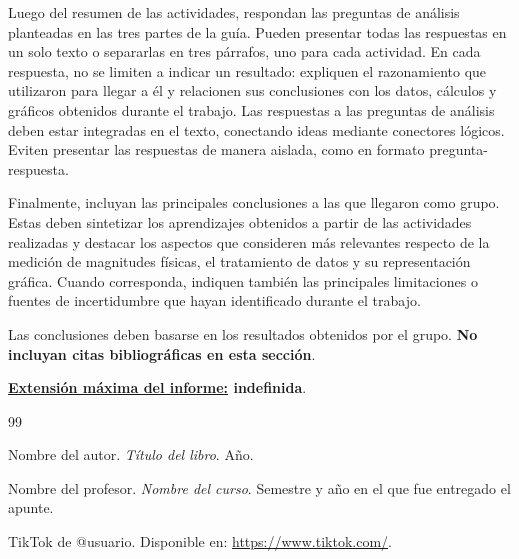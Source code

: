 \documentclass[12pt,a4paper]{article}
\begin{document}
Luego del resumen de las actividades, respondan las preguntas de análisis planteadas en las tres partes de la guía. Pueden presentar todas las respuestas en un solo texto o separarlas en tres párrafos, uno para cada actividad. En cada respuesta, no se limiten a indicar un resultado: expliquen el razonamiento que utilizaron para llegar a él y relacionen sus conclusiones con los datos, cálculos y gráficos obtenidos durante el trabajo. Las respuestas a las preguntas de análisis deben estar integradas en el texto, conectando ideas mediante conectores lógicos. Eviten presentar las respuestas de manera aislada, como en formato pregunta-respuesta.

Finalmente, incluyan las principales conclusiones a las que llegaron como grupo. Estas deben sintetizar los aprendizajes obtenidos a partir de las actividades realizadas y destacar los aspectos que consideren más relevantes respecto de la medición de magnitudes físicas, el tratamiento de datos y su representación gráfica. Cuando corresponda, indiquen también las principales limitaciones o fuentes de incertidumbre que hayan identificado durante el trabajo.

Las conclusiones deben basarse en los resultados obtenidos por el grupo. \textbf{No incluyan citas bibliográficas en esta sección}.

\textbf{\underline{Extensión máxima del informe:} indefinida}.

\begin{thebibliography}{99}

 Nombre del autor. \textit{Título del libro}. Año.

 Nombre del profesor. \textit{Nombre del curso}. Semestre y año en el que fue entregado el apunte.

 TikTok de @usuario. Disponible en: \url{https://www.tiktok.com/}. 

\end{thebibliography}
\end{document}
